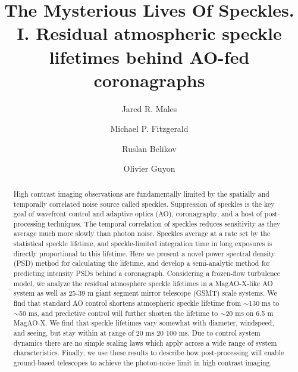 \documentclass[10pt,preprint]{aastex631}
\begin{document}
\title{The Mysterious Lives Of Speckles. I. Residual atmospheric speckle lifetimes behind AO-fed coronagraphs}

\author{Jared R. Males}

\author{Michael P. Fitzgerald}

\author{Ruslan Belikov}

\author{Olivier Guyon}

\begin{abstract}
High contrast imaging observations are fundamentally limited by the spatially and temporally correlated noise source called speckles.  Suppression of speckles is the key goal of wavefront control and adaptive optics (AO), coronagraphy, and a host of post-processing techniques.  The temporal correlation of speckles reduces sensitivity as they average much more slowly than photon noise.  Speckles average at a rate set by the statistical speckle lifetime, and speckle-limited integration time in long exposures is directly proportional to this lifetime.  Here we present a novel power spectral density (PSD) method for calculating the lifetime, and develop a semi-analytic method for predicting intensity PSDs behind a coronagraph.  Considering a frozen-flow turbulence model, we analyze the residual atmosphere speckle lifetimes in a MagAO-X-like AO system as well as 25-39 m giant segment mirror telescope (GSMT) scale systems.  We find that standard AO control shortens atmospheric speckle lifetime from $\sim$130 ms to $\sim$50 ms, and predictive control will further shorten the lifetime to $\sim$20 ms on 6.5 m MagAO-X. We find that speckle lifetimes vary somewhat with diameter, windspeed, and seeing, but stay within at range of 20 ms 20 100 ms. Due to control system dynamics there are no simple scaling laws which apply across a wide range of system characteristics.  Finally, we use these results to describe how post-processing will enable ground-based telescopes to achieve the photon-noise limit in high contrast imaging.
\end{abstract}
\end{document}
